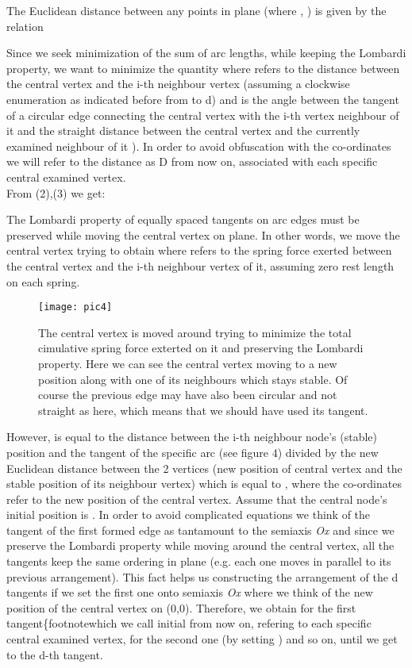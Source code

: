 \documentclass[10pt]{article}
\begin{document}
The Euclidean distance between any points  in plane (where , ) is given by the relation 


Since we seek minimization of the sum of arc lengths, while keeping the Lombardi property, we want to minimize the quantity  where  refers to the distance between the central vertex and the i-th neighbour vertex (assuming a clockwise enumeration as indicated before from  to d) and  is the angle between the tangent of a circular edge connecting the central vertex with the i-th vertex neighbour of it and the straight distance between the central vertex and the currently examined neighbour of it ). In order to avoid obfuscation with the co-ordinates we will refer to the distance  as D from now on, associated with each specific central examined vertex.
\\

From (2),(3) we get:



The Lombardi property of equally spaced tangents on arc edges must be preserved while moving the central vertex on plane. In other words, we move the central vertex trying to obtain  where  refers to the spring force exerted between the central vertex and the i-th neighbour vertex of it, assuming zero rest length on each spring. 


\begin{figure}
\begin{center}
\texttt{[image: pic4]}
\end{center}
\caption{The central vertex is moved around trying to minimize the total cimulative spring force exterted on it and preserving the Lombardi property. Here we can see the central vertex moving to a new position along with one of its neighbours which stays stable. Of course the previous edge may have also been circular and not straight as here, which means that we should have used its tangent.}
\end{figure}


However,  is equal to the distance between the i-th neighbour node's (stable) position and the tangent of the specific arc (see figure 4) divided by the new Euclidean distance between the 2 vertices (new position of central vertex and the stable position of its neighbour vertex) which is equal to , where the co-ordinates  refer to the new position of the central vertex. Assume that the central node's initial position is . In order to avoid complicated equations we think of the tangent of the first formed edge as tantamount to the semiaxis \textit{Ox} and since we preserve the Lombardi property while moving around the central vertex, all the tangents keep the same ordering in plane (e.g. each one moves in parallel to its previous arrangement). This fact helps us constructing the arrangement of the d tangents if we set the first one onto semiaxis \textit{Ox} where we think of the new position of the central vertex on (0,0). Therefore, we obtain  for the first tangent\{footnote{which we call initial from now on, refering to each specific central examined vertex},  for the second one (by setting ) and so on, until we get to the d-th tangent. 
\end{document}
